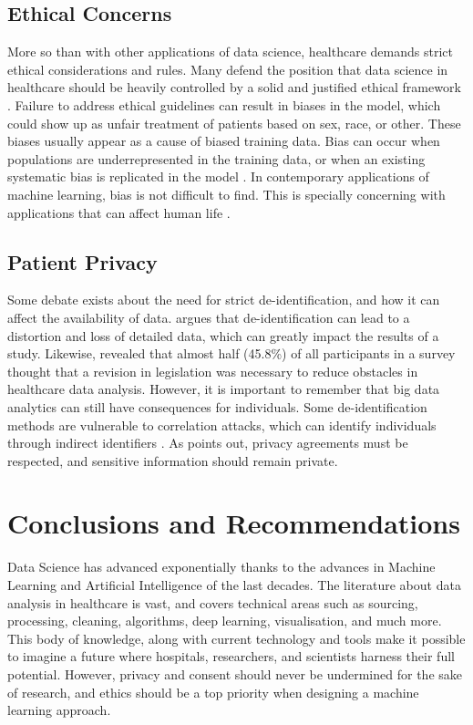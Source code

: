 \documentclass[a4paper,11pt]{article}
\begin{document}
\subsection{Ethical Concerns}

More so than with other applications of data science, healthcare demands strict
ethical considerations and rules.
Many defend the position that data science in healthcare should be
heavily controlled by a solid and justified ethical framework \parencite{Baeroee2020}.
Failure to address ethical guidelines can result in biases in the model,
which could show up as unfair treatment of patients based on sex, race, or other.
These biases usually appear as a cause of biased training data.
Bias can occur when populations are underrepresented in the training data,
or when an existing systematic bias is replicated in the model \parencite{Chen2021}.
In contemporary applications of machine learning, bias is not difficult to find.
This is specially concerning with applications that can affect human life 
\parencite{Yapo2018}.

\subsection{Patient Privacy}

Some debate exists about the need for strict de-identification,
and how it can affect the availability of data.
\textcite[2]{Shin2018} argues that de-identification can lead to a distortion
and loss of detailed data, which can greatly impact the results of a study.
Likewise, \textcite{Kim2019} revealed that almost half (45.8\%) of all
participants in a survey thought that a revision in legislation was necessary
to reduce obstacles in healthcare data analysis.
However, it is important to remember that big data analytics can still have
consequences for individuals.
Some de-identification methods are vulnerable to correlation attacks, which can
identify individuals through indirect identifiers \parencite{Abouelmehdi2018}.
As \textcite{Abouelmehdi2018} points out, privacy agreements must be respected,
and sensitive information should remain private.


\section{Conclusions and Recommendations}

Data Science has advanced exponentially thanks to the advances in Machine
Learning and Artificial Intelligence of the last decades.
The literature about data analysis in healthcare is vast, and covers technical
areas such as sourcing, processing, cleaning, algorithms, deep learning,
visualisation, and much more.
This body of knowledge, along with current technology and tools make it
possible to imagine a future where hospitals, researchers, and scientists
harness their full potential.
However, privacy and consent should never be undermined for the sake of research,
and ethics should be a top priority when designing a machine learning approach.
\end{document}
